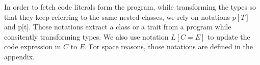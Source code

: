
In order to fetch code literals form the program, while transforming the types so that they keep referring to the same nested classes, we rely on notations
$p[T]$ and p[t].
Those notations extract a class or a trait from a program while consitently transforming types.
We also use notation $L[C=E]$ to update the code expression in $C$ to $E$.
For space reasons, those notations are defined in the appendix.




\begin{comment}
Define operations on p
--------------------------------------
p.evilPush(L) = (C = L, p)
	for fresh C

p.push(id) = (id = L, p)
    p = (id' = {_;_, id = L, _ ;_}, _; Ds)

(id = L, p).pop() = p
(id = L, p).top() = L

Define equivy ops...
------------------------------
empty =p empty
P, Ps =p P', Ps' iff:
	p.minimize(P) = p.minimize(P')
	Ps =p Ps'

Pz subseteq_p Pz' iff:
	p.minimize(Pz) subseteq p.minimize(Pz')

p.minimize(empty) = empty
p.minimize(P, Pz) = p.minimize(P), p.minimize(Pz)

p.minimize(Thisn+1.idn.Cs) = p.minimize(Thisn.Cs):
  p = id0 = L0, ..., idn = Ln, _; Ds
  p(Thisn.Cs) = L
  // TODO: Check that Ln is an L instead?

otherwise p.minimize(P) = P

define dom(Mz) = Midz
===========================================
dom(empty) = empty
dom(C = E, Mz) = C, dom(Mz)
dom(T m(Txs), Mz) = m, dom(Mz)
\end{comment}

